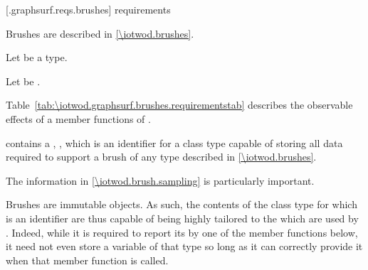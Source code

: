 
 [\iotwod.graphsurf.reqs.brushes]{ requirements}

\pnum
Brushes are described in \ref{\iotwod.brushes}.

\pnum
Let  be a \graphicssurfacestemplparam type.

\pnum
Let  be .

\pnum
Table~\ref{tab:\iotwod.graphsurf.brushes.requirementstab} describes the observable effects of a member functions of .

\pnum
{} contains a , 
, which is an identifier for a class type capable of
storing all data required to support a brush of any type described in
\ref{\iotwod.brushes}. \begin{note}
The information in \ref{\iotwod.brush.sampling} is particularly important.
\end{note}

\pnum
\begin{note}
Brushes are immutable objects. As such, the contents of the class type for which  is an identifier are thus capable of being highly tailored to the \underlyingrendandpresenttechs which are used by . Indeed, while it is required to report its  by one of the member functions below, it need not even store a variable of that type so long as it can correctly provide it when that member function is called.
\end{note}

